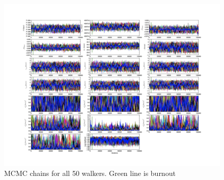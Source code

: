 \documentclass{article}
\begin{document}
\begin{figure}[!htb]
\centering
\includegraphics[width=\textwidth]{chainPlot_100000.jpg}
\caption{MCMC chains for all 50 walkers. Green line is burnout}
\end{figure}
\end{document}
